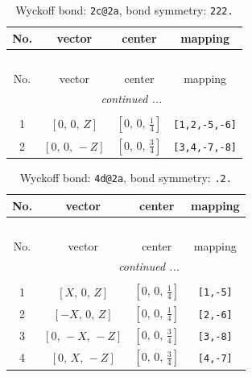 \documentclass[fleqn,8pt]{jsarticle}
\begin{document}
\renewcommand{\arraystretch}{1.2}
\begin{longtable}{cccc}
\caption{Wyckoff bond: {\tt 2c@2a}, bond symmetry: {\tt 222.}}
 \\
 \hline \hline
No. & vector & center & mapping \\ \hline \endfirsthead

\multicolumn{3}{l}{\tablename\ \thetable{}} \\
 \hline \hline
No. & vector & center & mapping \\ \hline \endhead

 \hline \hline
\multicolumn{3}{r}{\footnotesize\it continued ...} \\ \endfoot

 \hline \hline
\multicolumn{3}{r}{} \\ \endlastfoot

1 & $\left[ 0,\, 0,\, Z \right]$ & $\left[ 0,\, 0,\, \frac{1}{4} \right]$ & {\tt [1,2,-5,-6]} \\ \hline
2 & $\left[ 0,\, 0,\, - Z \right]$ & $\left[ 0,\, 0,\, \frac{3}{4} \right]$ & {\tt [3,4,-7,-8]} \\
\end{longtable}
\renewcommand{\arraystretch}{1.2}
\begin{longtable}{cccc}
\caption{Wyckoff bond: {\tt 4d@2a}, bond symmetry: {\tt .2.}}
 \\
 \hline \hline
No. & vector & center & mapping \\ \hline \endfirsthead

\multicolumn{3}{l}{\tablename\ \thetable{}} \\
 \hline \hline
No. & vector & center & mapping \\ \hline \endhead

 \hline \hline
\multicolumn{3}{r}{\footnotesize\it continued ...} \\ \endfoot

 \hline \hline
\multicolumn{3}{r}{} \\ \endlastfoot

1 & $\left[ X,\, 0,\, Z \right]$ & $\left[ 0,\, 0,\, \frac{1}{4} \right]$ & {\tt [1,-5]} \\ \hline
2 & $\left[ - X,\, 0,\, Z \right]$ & $\left[ 0,\, 0,\, \frac{1}{4} \right]$ & {\tt [2,-6]} \\ \hline
3 & $\left[ 0,\, - X,\, - Z \right]$ & $\left[ 0,\, 0,\, \frac{3}{4} \right]$ & {\tt [3,-8]} \\ \hline
4 & $\left[ 0,\, X,\, - Z \right]$ & $\left[ 0,\, 0,\, \frac{3}{4} \right]$ & {\tt [4,-7]} \\
\end{longtable}
\end{document}
